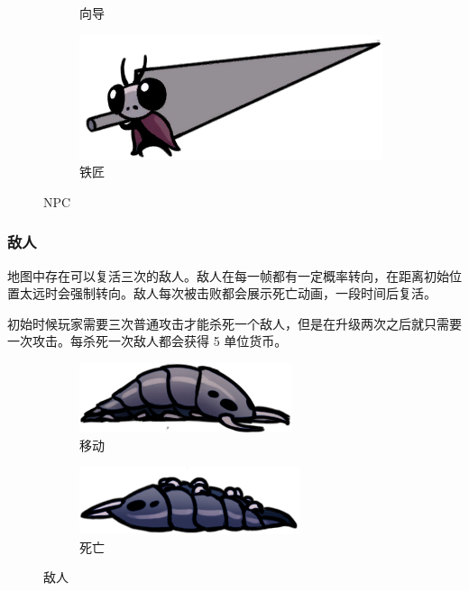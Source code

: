 \documentclass[12pt, twoside, a4paper]{article}
\begin{document}
\begin{figure}[h!]
\begin{subfigure}{0.15\textwidth}
        \caption{向导}
    \end{subfigure}
    \hspace{0.2\textwidth}
    \begin{subfigure}{0.4\textwidth}
        \includegraphics[width=\textwidth]{assets/report/blacksmith.png}
        \caption{铁匠}
    \end{subfigure}
    \caption{NPC}
\end{figure}

\subsubsection{敌人}

地图中存在可以复活三次的敌人。敌人在每一帧都有一定概率转向，在距离初始位置太远时会强制转向。敌人每次被击败都会展示死亡动画，一段时间后复活。

初始时候玩家需要三次普通攻击才能杀死一个敌人，但是在升级两次之后就只需要一次攻击。每杀死一次敌人都会获得 5 单位货币。

\begin{figure}[h!]
    \centering
    \begin{subfigure}{0.4\textwidth}
        \includegraphics[width=\textwidth]{assets/report/centipede_move0.png}
        \caption{移动}
    \end{subfigure}
    \hspace{0.05\textwidth}
    \begin{subfigure}{0.4\textwidth}
        \includegraphics[width=\textwidth]{assets/report/centipede_death.png}
        \caption{死亡}
    \end{subfigure}
    \caption{敌人}
\end{figure}
\end{document}
